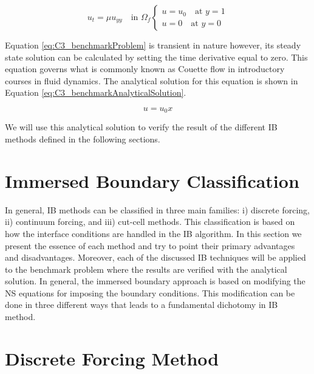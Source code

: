 \begin{subequations}\label{eq:C3_benchmarkProblem}
\begin{equation}
	u_t = \mu u_{yy} \quad \text{in } \Omega_f
\end{equation}
\begin{equation}
\begin{cases}
	u = u_0 \quad \text{at } y = 1 \\
	u = 0 \quad \text{at } y = 0
\end{cases}
\end{equation}
\end{subequations}

Equation \eqref{eq:C3_benchmarkProblem} is transient in nature however, its steady state solution can be calculated by setting the time derivative equal to zero. This equation governs what is commonly known as Couette flow in introductory courses in fluid dynamics. The analytical solution for this equation is shown in Equation \eqref{eq:C3_benchmarkAnalyticalSolution}.

\begin{equation}\label{eq:C3_benchmarkAnalyticalSolution}
	u = u_0 x
\end{equation}

We will use this analytical solution to verify the result of the different IB methods defined in the following sections.

\section{Immersed Boundary Classification}
In general, IB methods can be classified in three main families: i) discrete forcing, ii) continuum forcing, and iii) cut-cell methods. This classification is based on how the interface conditions are handled in the IB algorithm. In this section we present the essence of each method and try to point their primary advantages and disadvantages. Moreover, each of the discussed IB techniques will be applied to the benchmark problem where the results are verified with the analytical solution. In general, the immersed boundary approach is based on modifying the NS equations for imposing the boundary conditions. This modification can be done in three different ways that leads to a fundamental dichotomy in IB method.

\section{Discrete Forcing Method}
